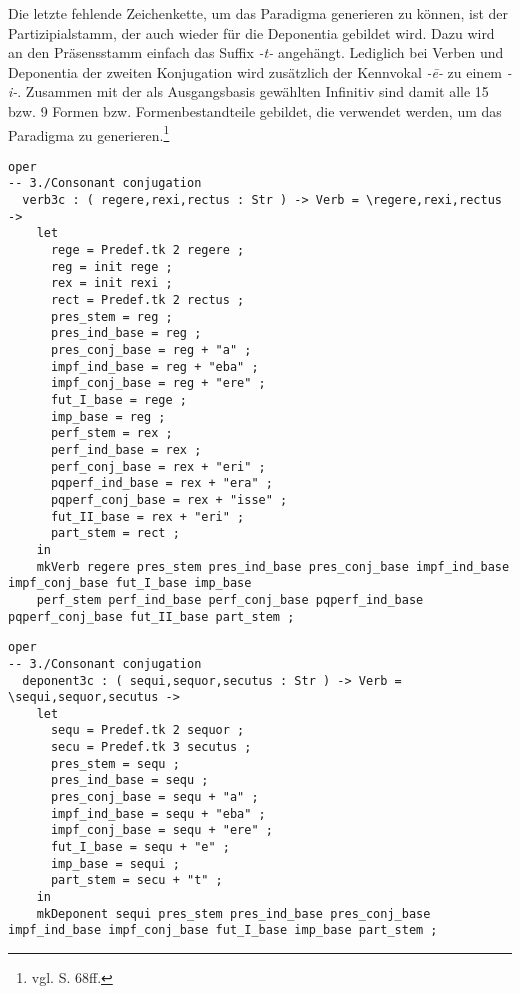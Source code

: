 Die letzte fehlende Zeichenkette, um das Paradigma generieren zu können, ist der Partizipialstamm, der auch wieder für die Deponentia gebildet wird. Dazu wird an den Präsensstamm einfach das Suffix \textit{-t-} angehängt. Lediglich bei Verben und Deponentia der zweiten Konjugation wird zusätzlich der Kennvokal \textit{-ē-} zu einem \textit{-i-}. Zusammen mit der als Ausgangsbasis gewählten Infinitiv sind damit alle 15 bzw. 9 Formen bzw. Formenbestandteile gebildet, die verwendet werden, um das Paradigma zu generieren.\footnote{vgl. \cite{BAYER-LINDAUER1994} S. 68ff.} \par
\begin{lstlisting}[float=h!tp,caption={Bildung der Wortstämme und -stöcke für Verben der dritten Konjugation mit konsonantischem Stamm (vgl. \textbf{MorphoLat.gf})},label={GF-Morpho-Verb3c},basicstyle=\small]
oper
-- 3./Consonant conjugation
  verb3c : ( regere,rexi,rectus : Str ) -> Verb = \regere,rexi,rectus ->
    let
      rege = Predef.tk 2 regere ;
      reg = init rege ;
      rex = init rexi ;
      rect = Predef.tk 2 rectus ;
      pres_stem = reg ;
      pres_ind_base = reg ;
      pres_conj_base = reg + "a" ;
      impf_ind_base = reg + "eba" ;
      impf_conj_base = reg + "ere" ;
      fut_I_base = rege ;
      imp_base = reg ;
      perf_stem = rex ;
      perf_ind_base = rex ;
      perf_conj_base = rex + "eri" ;
      pqperf_ind_base = rex + "era" ;
      pqperf_conj_base = rex + "isse" ;
      fut_II_base = rex + "eri" ;
      part_stem = rect ;
    in
    mkVerb regere pres_stem pres_ind_base pres_conj_base impf_ind_base impf_conj_base fut_I_base imp_base
    perf_stem perf_ind_base perf_conj_base pqperf_ind_base pqperf_conj_base fut_II_base part_stem ;
\end{lstlisting}
\begin{lstlisting}[float=h!tp,caption={Bildung der Wortstämme und -stöcke für Deponentia der dritten Konjugation mit konsonantischem Stamm (vgl. \textbf{MorphoLat.gf})},label={GF-Morpho-Deponent3c},basicstyle=\small]
oper
-- 3./Consonant conjugation
  deponent3c : ( sequi,sequor,secutus : Str ) -> Verb = \sequi,sequor,secutus ->
    let
      sequ = Predef.tk 2 sequor ;
      secu = Predef.tk 3 secutus ; 
      pres_stem = sequ ;
      pres_ind_base = sequ ;
      pres_conj_base = sequ + "a" ;
      impf_ind_base = sequ + "eba" ;
      impf_conj_base = sequ + "ere" ;
      fut_I_base = sequ + "e" ;
      imp_base = sequi ;
      part_stem = secu + "t" ;
    in
    mkDeponent sequi pres_stem pres_ind_base pres_conj_base impf_ind_base impf_conj_base fut_I_base imp_base part_stem ;
\end{lstlisting}
